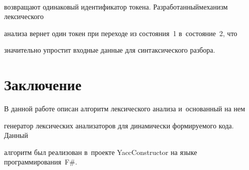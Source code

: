\





\vspace*{-12pt}










\noindent


возвращают одинаковый идентификатор токена. Разработанный\linebreak механизм лексического 


анализа вернет один токен при переходе из состояния~1 в~состояние~2, что 


значительно упростит входные данные для синтаксического разбора.














\section{Заключение}





В данной работе описан алгоритм лексического анализа и~основанный на нем 


генератор лексических анализаторов для динамически формируемого кода. Данный 


алгоритм был реализован в~проекте YaccConstructor на языке программирования~F\#. 


